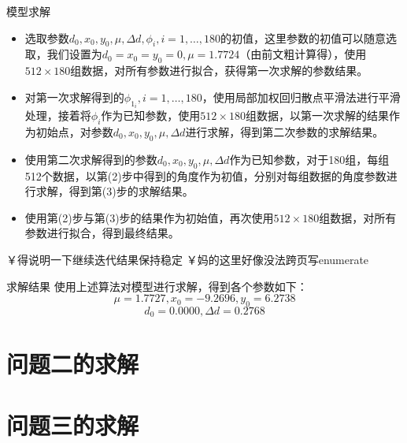 \documentclass{beamer}
\begin{document}
  \begin{frame}{模型求解}
    \begin{itemize}
      \item 选取参数\(d_0,x_0,y_0,\mu,\Delta d,\phi_i,i=1,\ldots,180\)的初值，这里参数的初值可以随意选取，我们设置为\(d_0 = x_0 = y_0 =  0,\mu = 1.7724\)（由前文粗计算得），使用\(512\times 180\)组数据，对所有参数进行拟合，获得第一次求解的参数结果。
      \item 对第一次求解得到的\(\phi_{1_i},i=1,\ldots,180\)，使用局部加权回归散点平滑法进行平滑处理，接着将\(\phi_i\)作为已知参数，使用\(512\times 180\)组数据，以第一次求解的结果作为初始点，对参数\(d_0,x_0,y_0,\mu,\Delta d\)进行求解，得到第二次参数的求解结果。
    \end{itemize}
    \end{frame}

    \begin{frame}
    \begin{itemize}
      \item 使用第二次求解得到的参数\(d_0,x_0,y_0,\mu,\Delta d\)作为已知参数，对于180组，每组512个数据，以第(2)步中得到的角度作为初值，分别对每组数据的角度参数进行求解，得到第(3)步的求解结果。
      \item 使用第(2)步与第(3)步的结果作为初始值，再次使用\(512\times 180\)组数据，对所有参数进行拟合，得到最终结果。
      \end{itemize}
      ￥得说明一下继续迭代结果保持稳定
      ￥妈的这里好像没法跨页写enumerate
  \end{frame}

  \begin{frame}{求解结果} 
    使用上述算法对模型进行求解，得到各个参数如下：
    \[\mu = 1.7727,x_0 = -9.2696,y_0 = 6.2738\]
    \[d_0 = 0.0000,\Delta d = 0.2768\]
  \end{frame}
  \section{问题二的求解}
  \section{问题三的求解}
\end{document}
